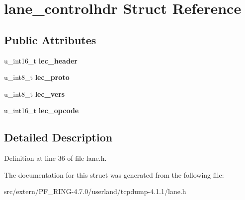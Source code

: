 \hypertarget{structlane__controlhdr}{
\section{lane\_\-controlhdr Struct Reference}
\label{structlane__controlhdr}
}
\subsection*{Public Attributes}
\begin{DoxyCompactItemize}
\item 
\hypertarget{structlane__controlhdr_a0d0e470fd1096379357d0fddd9a5a05f}{
u\_\-int16\_\-t {\bfseries lec\_\-header}}
\label{structlane__controlhdr_a0d0e470fd1096379357d0fddd9a5a05f}

\item 
\hypertarget{structlane__controlhdr_a1e92bfd10eafc2b8fe7943d812d8a302}{
u\_\-int8\_\-t {\bfseries lec\_\-proto}}
\label{structlane__controlhdr_a1e92bfd10eafc2b8fe7943d812d8a302}

\item 
\hypertarget{structlane__controlhdr_ad4b1daf5d85bab02ca142d16e02eaf7b}{
u\_\-int8\_\-t {\bfseries lec\_\-vers}}
\label{structlane__controlhdr_ad4b1daf5d85bab02ca142d16e02eaf7b}

\item 
\hypertarget{structlane__controlhdr_a9ddeac796a74996c1311f51422ebbbb9}{
u\_\-int16\_\-t {\bfseries lec\_\-opcode}}
\label{structlane__controlhdr_a9ddeac796a74996c1311f51422ebbbb9}

\end{DoxyCompactItemize}


\subsection{Detailed Description}


Definition at line 36 of file lane.h.



The documentation for this struct was generated from the following file:\begin{DoxyCompactItemize}
\item 
src/extern/PF\_\-RING-\/4.7.0/userland/tcpdump-\/4.1.1/lane.h\end{DoxyCompactItemize}
